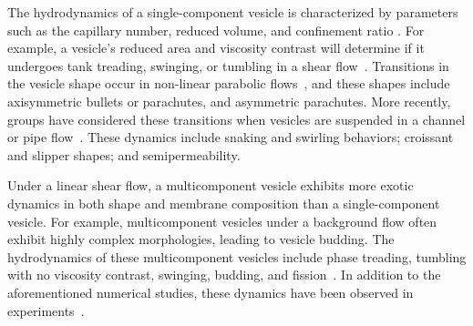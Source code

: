 \documentclass[twoside,twocolumn,9pt]{article}
\begin{document}
The hydrodynamics of a single-component vesicle is characterized by parameters such as the capillary number, reduced volume, and confinement ratio  \cite{Abreu2014_ACI}. 
For example, a
vesicle's reduced area and viscosity contrast will determine if it
undergoes tank treading, swinging, or tumbling in a shear
flow~\cite{nog-gom2005}. Transitions in the vesicle shape occur in
non-linear parabolic flows~\cite{kao-bir-mis2009, dan-vla-mis2009}, and
these shapes include axisymmetric bullets or parachutes, and asymmetric
parachutes. More recently, groups have considered these transitions when
vesicles are suspended in a channel or pipe
flow~\cite{lyu-che-far-jae-mis-leo2023, aga-bir2020, qua-gan-you2021,
abb-far-nai-ezz-ben-mis2022}. These dynamics include snaking and
swirling behaviors; croissant and slipper shapes; and semipermeability.

Under a linear shear flow, a multicomponent vesicle exhibits more exotic dynamics in both shape and membrane composition \cite{Sohn2010_JCP, Smith2007_JChemPhys,Cox2015_Nonlinearity,Liu2017_SoftMatter,Gera2018_SoftMatter,Gera2022_JFM} than a single-component vesicle.
For example, multicomponent vesicles under a background flow often exhibit highly complex morphologies, leading to vesicle budding. 
The hydrodynamics of these
multicomponent vesicles include phase treading, tumbling with no
viscosity contrast, swinging, budding, and
fission~\cite{soh-tse-li-voi-low2010, wan-du2008, all-ama2006,
ger-sal-spa2022, lip1992, urs-klu-phi2009}. In addition to the
aforementioned numerical studies, these dynamics have been observed in
experiments~\cite{bag-sun2009, yan-ima-tan2010, yan-ima-tan2008,
dre-jah-bob-spa-gop2021}.
\end{document}
